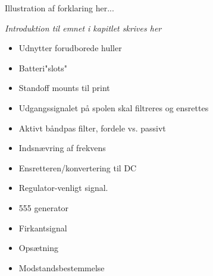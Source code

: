 Illustration af forklaring her...

\emph{Introduktion til emnet i kapitlet skrives her}
\begin {itemize}
\item Udnytter forudborede huller
\item Batteri"slots"
\item Standoff mounts til print

\item Udgangssignalet på spolen skal filtreres og ensrettes
\item Aktivt båndpas filter, fordele vs. passivt
\item Indsnævring af frekvens
\item Ensretteren/konvertering til DC
\item Regulator-venligt signal. 

\item 555 generator
\item Firkantsignal
\item Opsætning 
\item Modstandsbestemmelse
\end {itemize}

